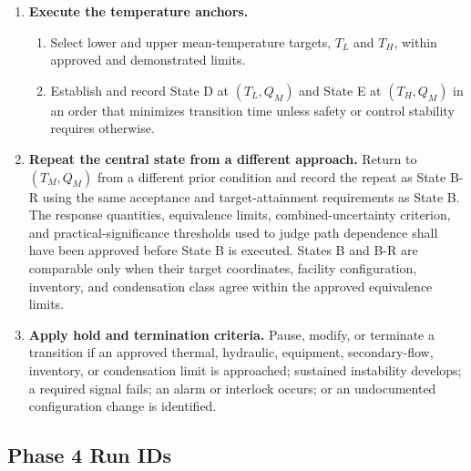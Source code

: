 \documentclass[11pt]{article}
\begin{document}
\begin{enumerate}
    \item \textbf{Execute the temperature anchors.}
    \begin{enumerate}
        \item Select lower and upper mean-temperature targets, $T_L$ and $T_H$, within approved and demonstrated limits.
        \item Establish and record State D at $(T_L,Q_M)$ and State E at $(T_H,Q_M)$ in an order that minimizes transition time unless safety or control stability requires otherwise.
    \end{enumerate}

    \item \textbf{Repeat the central state from a different approach.}
    Return to $(T_M,Q_M)$ from a different prior condition and record the repeat as State B-R using the same acceptance and target-attainment requirements as State B. The response quantities, equivalence limits, combined-uncertainty criterion, and practical-significance thresholds used to judge path dependence shall have been approved before State B is executed. States B and B-R are comparable only when their target coordinates, facility configuration, inventory, and condensation class agree within the approved equivalence limits.

    \item \textbf{Apply hold and termination criteria.}
    Pause, modify, or terminate a transition if an approved thermal, hydraulic, equipment, secondary-flow, inventory, or condensation limit is approached; sustained instability develops; a required signal fails; an alarm or interlock occurs; or an undocumented configuration change is identified.
\end{enumerate}

\subsection{Phase 4 Run IDs}
\end{document}

